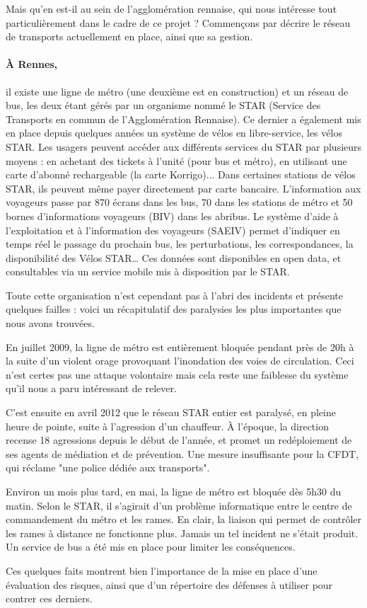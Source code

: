 	Mais qu'en est-il au sein de l'agglomération rennaise, qui nous intéresse tout particulièrement dans le cadre de ce projet ? Commençons par décrire le réseau de transports actuellement en place, ainsi que sa gestion.


	\paragraph{À Rennes,} il existe une ligne de métro (une deuxième est en construction) et un réseau de bus, les deux étant gérés par un organisme nommé le STAR (Service des Transports en commun de l'Agglomération Rennaise). Ce dernier a également mis en place depuis quelques années un système de vélos en libre-service, les vélos STAR. Les usagers peuvent accéder aux différents services du STAR par plusieurs moyens : en achetant des tickets à l'unité (pour bus et métro), en utilisant une carte d'abonné rechargeable (la carte Korrigo)... Dans certaines stations de vélos STAR, ils peuvent même payer directement par carte bancaire. L'information aux voyageurs passe par 870 écrans dans les bus, 70 dans les stations de métro et 50 bornes d’informations voyageurs (BIV) dans les abribus. Le système d’aide à l’exploitation et à l’information des voyageurs (SAEIV) permet d’indiquer en temps réel le passage du prochain bus, les perturbations, les correspondances, la disponibilité des Vélos STAR… Ces données sont disponibles en open data, et consultables via un service mobile mis à disposition par le STAR.

	Toute cette organisation n'est cependant pas à l'abri des incidents et présente quelques failles : voici un récapitulatif des paralysies les plus importantes que nous avons trouvées.

	En juillet 2009, la ligne de métro est entièrement bloquée pendant près de 20h à la suite d'un violent orage provoquant l'inondation des voies de circulation. Ceci n'est certes pas une attaque volontaire mais cela reste une faiblesse du système qu'il nous a paru intéressant de relever. 

	C'est ensuite en avril 2012 que le réseau STAR entier est paralysé, en pleine heure de pointe, suite à l'agression d'un chauffeur. À l'époque, la direction recense 18 agressions depuis le début de l'année, et promet un redéploiement de ses agents de médiation et de prévention. Une mesure insuffisante pour la CFDT, qui réclame "une police dédiée aux transports".

	Environ un mois plus tard, en mai, la ligne de métro est bloquée dès 5h30 du matin. Selon le STAR, il s’agirait d’un problème informatique entre le centre de commandement du métro et les rames. En clair, la liaison qui permet de contrôler les rames à distance ne fonctionne plus. Jamais un tel incident ne s’était produit. Un service de bus a été mis en place pour limiter les conséquences.

	Ces quelques faits montrent bien l'importance de la mise en place d'une évaluation des risques, ainsi que d'un répertoire des défenses à utiliser pour contrer ces derniers.